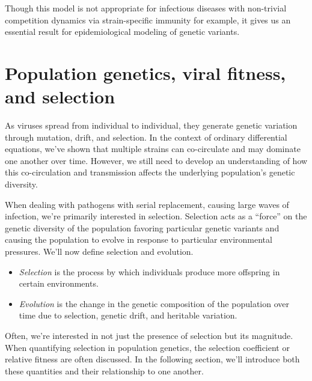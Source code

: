 Though this model is not appropriate for infectious diseases with non-trivial competition dynamics via strain-specific immunity for example, it gives us an essential result for epidemiological modeling of genetic variants. \cite{Gog2002}



\section{Population genetics, viral fitness, and selection}

As viruses spread from individual to individual, they generate genetic variation through mutation, drift, and selection.
In the context of ordinary differential equations, we've shown that multiple strains can co-circulate and may dominate one another over time.
However, we still need to develop an understanding of how this co-circulation and transmission affects the underlying population's genetic diversity.

When dealing with pathogens with serial replacement, causing large waves of infection, we're primarily interested in selection.
Selection acts as a ``force'' on the genetic diversity of the population favoring particular genetic variants and causing the population to evolve in response to particular environmental pressures.
We'll now define selection and evolution.

\begin{itemize}
  \item \emph{Selection} is the process by which individuals produce more offspring in certain environments.
  \item \emph{Evolution} is the change in the genetic composition of the population over time due to selection, genetic drift, and heritable variation.
\end{itemize}

Often, we’re interested in not just the presence of selection but its magnitude.
When quantifying selection in population genetics, the selection coefficient or relative fitness are often discussed.
In the following section, we'll introduce both these quantities and their relationship to one another.

